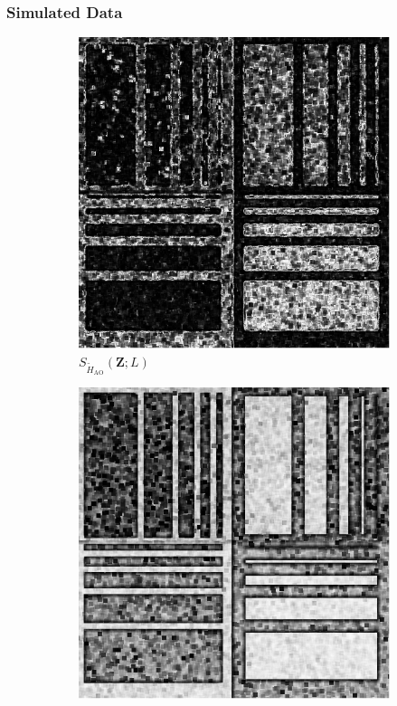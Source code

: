 \documentclass[aspectratio=1610,10pt]{beamer}
\begin{document}
\begin{frame} \frametitle{\large{Simulated Data }}\vspace{-0.1cm}

\begin{figure}[H]
  \centering
  \begin{subfigure}[b]{0.3\textwidth}
    \centering
    \includegraphics[width=\textwidth]{../../Figures/PNG/H_pvalue_Phantom_4_z1_200b}
    \caption{$S_{\widetilde{H}_{\text{AO}}}(\bm{Z}; L)$}
    \label{fig:sim_SAR_Images-1}
  \end{subfigure}
  \hfill
  \begin{subfigure}[b]{0.3\textwidth}
    \centering
    \includegraphics[width=\textwidth]{../../Figures/PNG/cv_pvalues_Phantom_4_z1}

\end{subfigure}
\end{figure}
\end{frame}
\end{document}
